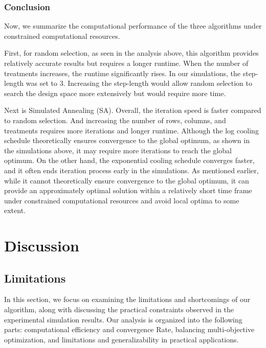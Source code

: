 \documentclass[
  a4paper,
  oneside,
  openany,
  12pt,
  onecolumn]{book}
\theoremstyle{definition}
\theoremstyle{definition}
\theoremstyle{plain}
\theoremstyle{remark}
\begin{document}
\subsection{Conclusion}\label{conclusion}

Now, we summarize the computational performance of the three algorithms
under constrained computational resources.

First, for random selection, as seen in the analysis above, this
algorithm provides relatively accurate results but requires a longer
runtime. When the number of treatments increases, the runtime
significantly rises. In our simulations, the step-length was set to 3.
Increasing the step-length would allow random selection to search the
design space more extensively but would require more time.

Next is Simulated Annealing (SA). Overall, the iteration speed is faster
compared to random selection. And increasing the number of rows,
columns, and treatments requires more iterations and longer runtime.
Although the log cooling schedule theoretically ensures convergence to
the global optimum, as shown in the simulations above, it may require
more iterations to reach the global optimum. On the other hand, the
exponential cooling schedule converges faster, and it often ends
iteration process early in the simulations. As mentioned earlier, while
it cannot theoretically ensure convergence to the global optimum, it can
provide an approximately optimal solution within a relatively short time
frame under constrained computational resources and avoid local optima
to some extent.


\chapter{Discussion}\label{sec-discuss}

\section{Limitations}\label{limitations}

In this section, we focus on examining the limitations and shortcomings
of our algorithm, along with discussing the practical constraints
observed in the experimental simulation results. Our analysis is
organized into the following parts: computational efficiency and
convergence Rate, balancing multi-objective optimization, and
limitations and generalizability in practical applications.
\end{document}
